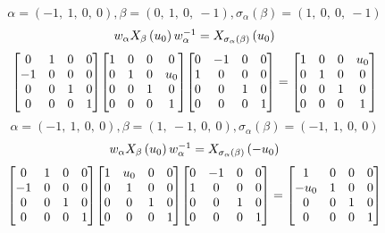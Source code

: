 \documentclass[11pt]{article}
\theoremstyle{definition}
\begin{document}
\[
\alpha = \left( -1, \  1, \  0, \  0\right), \beta = \left( 0, \  1, \  0, \  -1\right), \sigma_{\alpha}(\beta) = \left( 1, \  0, \  0, \  -1\right)
\]
\[
\scaletoalign{\textwidth}{w_{\alpha} X_{\beta}\left(u_{0}\right) w_{\alpha}^{-1} = X_{\sigma_{\alpha}\left(\beta\right)}\left(u_{0}\right)}
\]
\[
\scaletoalign{\textwidth}{{\left[\begin{matrix}0 & 1 & 0 & 0\\-1 & 0 & 0 & 0\\0 & 0 & 1 & 0\\0 & 0 & 0 & 1\end{matrix}\right]} {\left[\begin{matrix}1 & 0 & 0 & 0\\0 & 1 & 0 & u_{0}\\0 & 0 & 1 & 0\\0 & 0 & 0 & 1\end{matrix}\right]} {\left[\begin{matrix}0 & -1 & 0 & 0\\1 & 0 & 0 & 0\\0 & 0 & 1 & 0\\0 & 0 & 0 & 1\end{matrix}\right]} = {\left[\begin{matrix}1 & 0 & 0 & u_{0}\\0 & 1 & 0 & 0\\0 & 0 & 1 & 0\\0 & 0 & 0 & 1\end{matrix}\right]}}
\]
\[
\alpha = \left( -1, \  1, \  0, \  0\right), \beta = \left( 1, \  -1, \  0, \  0\right), \sigma_{\alpha}(\beta) = \left( -1, \  1, \  0, \  0\right)
\]
\[
\scaletoalign{\textwidth}{w_{\alpha} X_{\beta}\left(u_{0}\right) w_{\alpha}^{-1} = X_{\sigma_{\alpha}\left(\beta\right)}\left(- u_{0}\right)}
\]
\[
\scaletoalign{\textwidth}{{\left[\begin{matrix}0 & 1 & 0 & 0\\-1 & 0 & 0 & 0\\0 & 0 & 1 & 0\\0 & 0 & 0 & 1\end{matrix}\right]} {\left[\begin{matrix}1 & u_{0} & 0 & 0\\0 & 1 & 0 & 0\\0 & 0 & 1 & 0\\0 & 0 & 0 & 1\end{matrix}\right]} {\left[\begin{matrix}0 & -1 & 0 & 0\\1 & 0 & 0 & 0\\0 & 0 & 1 & 0\\0 & 0 & 0 & 1\end{matrix}\right]} = {\left[\begin{matrix}1 & 0 & 0 & 0\\- u_{0} & 1 & 0 & 0\\0 & 0 & 1 & 0\\0 & 0 & 0 & 1\end{matrix}\right]}}
\]
\end{document}
